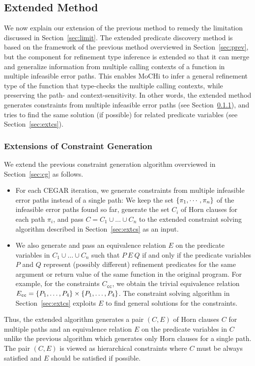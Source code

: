 \subsection{Extended Method}
\label{sec:ext}

We now explain our extension of the previous method to remedy the 
limitation discussed in Section~\ref{sec:limit}.  The extended predicate 
discovery method is based on the framework of the previous method 
overviewed in Section~\ref{sec:prev}, but the component for refinement 
type inference is extended so that it can merge and generalize 
information from multiple calling contexts of a function in multiple 
infeasible error paths.  This enables MoCHi to infer a general 
refinement type of the function that type-checks the multiple calling 
contexts, while preserving the path- and context-sensitivity.  In other 
words, the extended method generates constraints from multiple 
infeasible error paths (see Section~\ref{sec:extcg}), and tries to find 
the same solution (if possible) for related predicate variables (see 
Section~\ref{sec:extcs}).

\subsubsection{Extensions of Constraint Generation}
\label{sec:extcg}

We extend the previous constraint generation algorithm overviewed in 
Section~\ref{sec:cg} as follows.
\begin{itemize}
\item For each CEGAR iteration, we generate constraints from multiple 
infeasible error paths instead of a single path:  We keep the set 
\(\{{\pi_1,\cdots,\pi_n}\}\) of the infeasible error paths found so far, 
generate the set \(C_i\) of Horn clauses for each path \(\pi_i\), and 
pass \(C=C_1 \cup \dots \cup C_n\) to the extended constraint solving 
algorithm described in Section~\ref{sec:extcs} as an input.
\item We also generate and pass an equivalence relation \(E\) on the 
predicate variables in \(C_1 \cup \dots \cup C_n\) such that \(P\ E\ Q\) 
if and only if the predicate variables \(P\) and \(Q\) represent 
(possibly different) refinement predicates for the same argument or 
return value of the same function in the original program.  For example, 
for the constraints \(C_{\texttt{cc}}\), we obtain the trivial 
equivalence relation \(E_{\texttt{cc}}=\{{P_1,\dots,P_4}\} \times 
\{{P_1,\dots,P_4}\}\).  The constraint solving algorithm in 
Section~\ref{sec:extcs} exploits \(E\) to find general solutions for the 
constraints.
\end{itemize}
Thus, the extended algorithm generates a pair \((C,E)\) of Horn clauses 
\(C\) for multiple paths and an equivalence relation \(E\) on the 
predicate variables in \(C\) unlike the previous algorithm which 
generates only Horn clauses for a single path.  The pair \((C,E)\) is 
viewed as hierarchical constraints where \(C\) must be always satisfied 
and \(E\) should be satisfied if possible.

